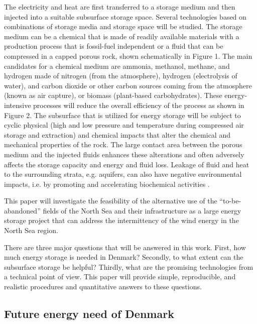 \documentclass{ECOS_2021}
\begin{document}
The electricity and heat are first transferred to a storage medium
and then injected into a suitable subsurface storage space. Several
technologies based on combinations of storage media and storage space
will be studied. The storage medium can be a chemical that is made
of readily available materials with a production process that is fossil-fuel
independent \cite{eftekhariQuantifyingRoleLiquid2020} or a fluid
that can be compressed in a capped porous rock, shown schematically
in Figure 1. The main candidates for a chemical medium are ammonia,
methanol, methane, and hydrogen made of nitrogen (from the atmosphere),
hydrogen (electrolysis of water), and carbon dioxide or other carbon
sources coming from the atmosphere (known as air capture), or biomass
(plant-based carbohydrates). These energy-intensive processes will
reduce the overall efficiency of the process as shown in Figure 2.
The subsurface that is utilized for energy storage will be subject
to cyclic physical (high and low pressure and temperature during compressed
air storage and extraction) and chemical impacts that alter the chemical
and mechanical properties of the rock. The large contact area between
the porous medium and the injected fluids enhances these alterations
and often adversely affects the storage capacity and energy and fluid
loss. Leakage of fluid and heat to the surrounding strata, e.g. aquifers,
can also have negative environmental impacts, i.e. by promoting and
accelerating biochemical activities \cite{bauerImpactsUseGeological2013}.

This paper will investigate the feasibility of the alternative use
of the ``to-be-abandoned'' fields of the North Sea and their infrastructure
as a large energy storage project that can address the intermittency
of the wind energy in the North Sea region.

There are three major questions that will be answered in this work.
First, how much energy storage is needed in Denmark? Secondly, to
what extent can the subsurface storage be helpful? Thirdly, what are
the promising technologies from a technical point of view. This paper
will provide simple, reproducible, and realistic procedures and quantitative
answers to these questions.

\sffamily \large \subsection{Future energy need of Denmark} \label{Submission}
\rmfamily \normalsize
\end{document}
